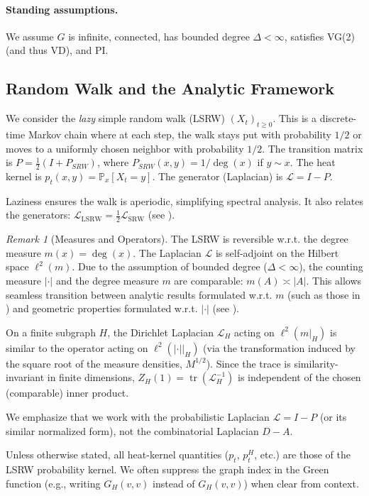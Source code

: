 \documentclass{article}
\numberwithin{equation}{section}
\theoremstyle{definition}
\theoremstyle{remark}
\newtheorem{remark}[theorem]{Remark}
\DeclareMathOperator{\tr}{tr}
\newcommand{\LL}{\mathcal{L}}
\newcommand{\Prob}{\mathbb{P}}
\begin{document}
\paragraph{Standing assumptions.} We assume $G$ is infinite, connected, has bounded degree $\Delta < \infty$, satisfies VG(2) (and thus VD), and PI.

\subsection{Random Walk and the Analytic Framework}

We consider the \emph{lazy} simple random walk (LSRW) $(X_t)_{t \geq 0}$. This is a discrete-time Markov chain where at each step, the walk stays put with probability $1/2$ or moves to a uniformly chosen neighbor with probability $1/2$. The transition matrix is $P = \frac{1}{2}(I + P_{SRW})$, where $P_{SRW}(x,y) = 1/\deg(x)$ if $y \sim x$. The heat kernel is $p_t(x,y) = \Prob_x[X_t = y]$. The generator (Laplacian) is $\LL = I - P$.

Laziness ensures the walk is aperiodic, simplifying spectral analysis. It also relates the generators: $\LL_{\text{LSRW}} = \frac{1}{2} \LL_{\text{SRW}}$ (see ).


\begin{remark}[Measures and Operators]\label{rem:measures_operators}
The LSRW is reversible w.r.t. the degree measure $m(x)=\deg(x)$. The Laplacian $\LL$ is self-adjoint on the Hilbert space $\ell^2(m)$. Due to the assumption of bounded degree ($\Delta < \infty$), the counting measure $|\cdot|$ and the degree measure $m$ are comparable: $m(A) \asymp |A|$. This allows seamless transition between analytic results formulated w.r.t. $m$ (such as those in ) and geometric properties formulated w.r.t. $|\cdot|$ (see \cite{Coulhon03}).


On a finite subgraph $H$, the Dirichlet Laplacian $\LL_H$ acting on $\ell^2(m|_H)$ is similar to the operator acting on $\ell^2(|\cdot||_H)$ (via the transformation induced by the square root of the measure densities, $M^{1/2}$). Since the trace is similarity-invariant in finite dimensions, $Z_H(1) = \tr(\LL_H^{-1})$ is independent of the chosen (comparable) inner product.


We emphasize that we work with the probabilistic Laplacian $\LL=I-P$ (or its similar normalized form), not the combinatorial Laplacian $D-A$.


Unless otherwise stated, all heat-kernel quantities ($p_t$, $p_t^H$, etc.) are those of the LSRW probability kernel. We often suppress the graph index in the Green function (e.g., writing $G_H(v,v)$ instead of $G_{H}(v,v)$) when clear from context.
\end{remark}
\end{document}

